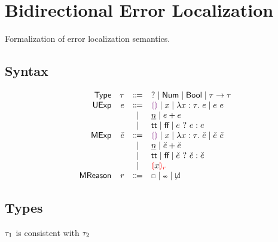 \documentclass{article}
\begin{document}
\renewcommand{\thesection}{\Alph{section}}
\section{Bidirectional Error Localization}
Formalization of error localization semantics.

\subsection{Syntax}
\[\begin{array}{rrcl}
  \TMName  & \TMV  & \Coloneqq & \TUnknown \mid \TNum \mid \TBool \mid \TArrow{\TMV}{\TMV} \\
  \EMName  & \EMV  & \Coloneqq & \EEHole \mid x \mid \ELam{x}{\TMV}{\EMV} \mid \EAp{\EMV}{\EMV} \\
           &       & \mid         & \ENumMV \mid \EPlus{\EMV}{\EMV} \\
           &       & \mid         & \ETrue \mid \EFalse \mid \EIf{\EMV}{\EMV}{\EMV} \\
  \ECMName & \ECMV & \Coloneqq & \ECEHole \mid x \mid \ECLam{x}{\TMV}{\ECMV} \mid \ECAp{\ECMV}{\ECMV} \\
           &       & \mid         & \ECNumMV \mid \ECPlus{\ECMV}{\ECMV} \\
           &       & \mid         & \ECTrue \mid \ECFalse \mid \ECIf{\ECMV}{\ECMV}{\ECMV} \\
           &       & \mid         & \ECMarked{x}{\MRMV} \\
  \MRMName & \MRMV & \Coloneqq & \MRUnbound \mid \MRInconType \mid \MRInconBr
\end{array}\]

\subsection{Types}
 $\TMV_1$ is consistent with $\TMV_2$
%
\begin{mathpar}



\end{mathpar} \\
\end{document}
